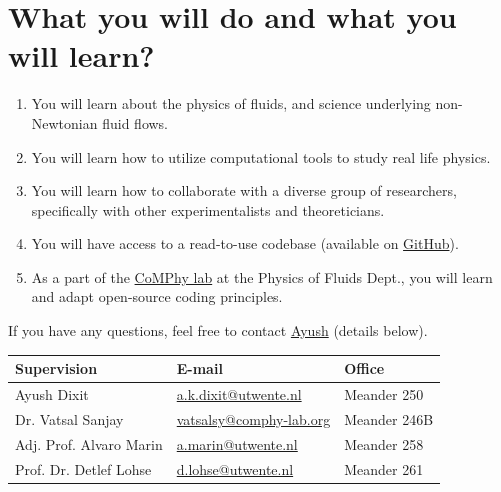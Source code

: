 \documentclass[a4paper,10pt]{article}
\begin{document}
\section*{What you will do and what you will learn?}
\begin{enumerate}
\item You will learn about the physics of fluids, and science underlying non-Newtonian fluid flows. 
\item You will learn how to utilize computational tools to study real life physics. 
\item You will learn how to collaborate with a diverse group of researchers, specifically with other experimentalists and theoreticians.
\item You will have access to a read-to-use codebase (available on \href{https://github.com/comphy-lab/Viscoelastic-Worthington-jets-and-droplets-produced-by-bursting-bubbles}{GitHub}).
\item As a part of the \href{https://comphy-lab.org}{CoMPhy lab} at the Physics of Fluids Dept., you will learn and adapt open-source coding principles. 

\end{enumerate}

If you have any questions, feel free to contact \href{mailto:a.k.dixit@utwente.nl}{Ayush} (details below).
\begin{center}
\begin{tabular}{|l|l|l|}
\hline \textbf{Supervision} & \textbf{E-mail} & \textbf{Office} \\
\hline Ayush Dixit & \href{mailto:a.k.dixit@utwente.nl}{a.k.dixit@utwente.nl} & Meander 250 \\
\hline Dr. Vatsal Sanjay & \href{mailto:vatsalsy@comphy-lab.org}{vatsalsy@comphy-lab.org} & Meander 246B \\
\hline Adj. Prof. Alvaro Marin & \href{mailto:a.marin@utwente.nl}{a.marin@utwente.nl} & Meander 258 \\
\hline Prof. Dr. Detlef Lohse & \href{mailto:d.lohse@utwente.nl}{d.lohse@utwente.nl} & Meander 261  \\
\hline
\end{tabular}
\end{center}
\printbibliography
\end{document}
